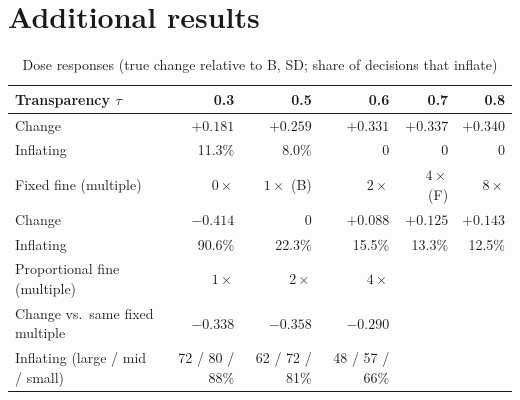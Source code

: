\documentclass[11pt]{article}
\begin{document}
\section{Additional results}\label{app:extra}

\begin{table}[h]
\centering
\small
\begin{threeparttable}
\caption{Dose responses (true change relative to B, SD; share of decisions that inflate)}
\label{tab:doses}
\begin{tabular}{@{}lrrrrr@{}}
\toprule
Transparency $\tau$ & 0.3 & 0.5 & 0.6 & 0.7 & 0.8 \\
\midrule
Change & $+0.181$ & $+0.259$ & $+0.331$ & $+0.337$ & $+0.340$ \\
Inflating & 11.3\% & 8.0\% & 0 & 0 & 0 \\
\midrule
Fixed fine (multiple) & $0\times$ & $1\times$ (B) & $2\times$ & $4\times$ (F) & $8\times$ \\
\midrule
Change & $-0.414$ & 0 & $+0.088$ & $+0.125$ & $+0.143$ \\
Inflating & 90.6\% & 22.3\% & 15.5\% & 13.3\% & 12.5\% \\
\midrule
Proportional fine (multiple) & $1\times$ & $2\times$ & $4\times$ & & \\
\midrule
Change vs.\ same fixed multiple & $-0.338$ & $-0.358$ & $-0.290$ & & \\
Inflating (large / mid / small) & 72 / 80 / 88\% & 62 / 72 / 81\% & 48 / 57 / 66\% & & \\
\bottomrule
\end{tabular}
\end{threeparttable}
\end{table}
\end{document}
